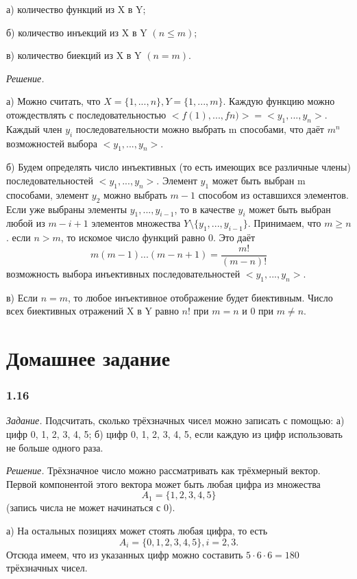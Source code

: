 \documentclass{book}
\begin{document}
а) количество функций из X в Y;

б) количество инъекций из X в Y $\left(n\leq m\right)$;

в) количество биекций из X в Y $\left(n=m\right)$.

\textit{Решение.}

а) Можно считать, что $X=\{1, ..., n\}, Y=\{1, ..., m\}$. Каждую функцию можно отождествлять с последовательностью $<f(1), ..., fn)>=<y_1, ..., y_n>$. Каждый член $y_i$ последовательности можно выбрать m способами, что даёт $m^n$ возможностей выбора $<y_1, ..., y_n>$.

б) Будем определять число инъективных (то есть имеющих все различные члены) последовательностей $<y_1, ..., y_n>$. Элемент $y_1$ может быть выбран m способами, элемент $y_2$ можно выбрать $m-1$ способом из оставшихся элементов. Если уже выбраны элементы $y_1, ..., y_{i-1}$, то в качестве $y_i$ может быть выбран любой из $m-i+1$ элементов множества $Y\setminus\{y_1, ..., y_{i-1}\}$. Принимаем, что $m\geq n$. если $n>m$, то искомое число функций равно 0. Это даёт $$m\left(m-1\right)...\left(m-n+1\right)=\frac{m!}{\left(m-n\right)!}$$ возможность выбора инъективных последовательностей $<y_1, ..., y_n>$.

в) Если $n=m$, то любое инъективное отображение будет биективным. Число всех биективных отражений X в Y равно $n!$ при $m=n$ и 0 при $m\neq n$.

\section*{Домашнее задание}

\subsubsection*{1.16}

\textit{Задание.} Подсчитать, сколько трёхзначных чисел можно записать с помощью: а) цифр 0, 1, 2, 3, 4, 5; б) цифр 0, 1, 2, 3, 4, 5, если каждую из цифр использовать не больше одного раза.

\textit{Решение.} Трёхзначное число можно рассматривать как трёхмерный вектор. Первой компонентой этого вектора может быть любая цифра из множества $$A_1=\{1, 2, 3, 4, 5\}$$ (запись числа не может начинаться с 0).

а) На остальных позициях может стоять любая цифра, то есть $$A_i=\{0, 1, 2, 3, 4, 5\}, i=2, 3.$$ Отсюда имеем, что из указанных цифр можно составить $5\cdot 6\cdot 6=180$ трёхзначных чисел.
\end{document}
